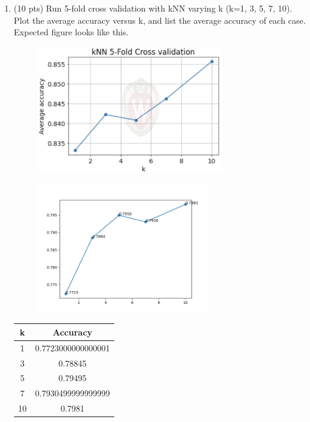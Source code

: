 \documentclass[a4paper]{article}
\theoremstyle{definition}
\newenvironment{soln}{
    \leavevmode\color{blue}\ignorespaces
}{}
\begin{document}
\begin{enumerate}
	\item (10 pts) Run 5-fold cross validation with kNN varying k (k=1, 3, 5, 7, 10). Plot the average accuracy versus k, and list the average accuracy of each case. \\
	      Expected figure looks like this.
	      \begin{figure}[h]
		      \centering
		      \includegraphics[width=8cm]{knn.png}
	      \end{figure}

	      \begin{soln}
		      \begin{figure}[h]
			      \centering
			      \includegraphics[width=0.7\textwidth]{../img/q2-4.png}
		      \end{figure}

		      \begin{center}
			      \begin{tabular}{c | c}
				      \hline
				      k  & Accuracy           \\ \hline
				      1  & 0.7723000000000001 \\
				      3  & 0.78845            \\
				      5  & 0.79495            \\
				      7  & 0.7930499999999999 \\
				      10 & 0.7981             \\
				      \hline
			      \end{tabular}
		      \end{center}


\end{soln}
\end{enumerate}
\end{document}
